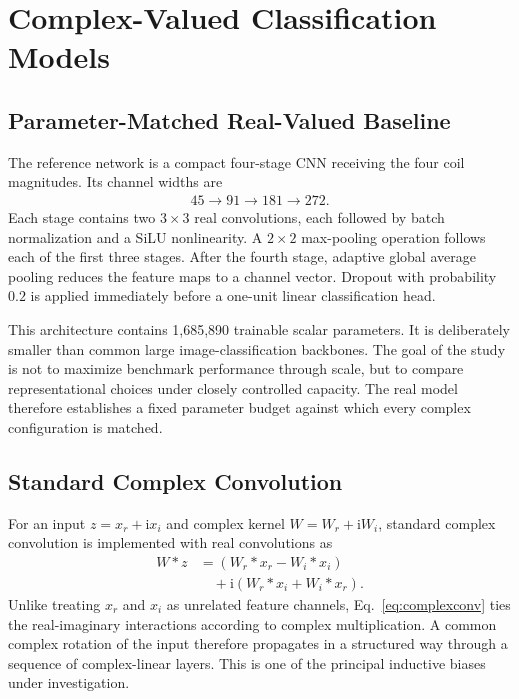 \documentclass[journal]{IEEEtran}
\begin{document}
\section{Complex-Valued Classification Models}\label{sec:models}
\subsection{Parameter-Matched Real-Valued Baseline}
The reference network is a compact four-stage \ac{CNN} receiving the four coil magnitudes. Its channel widths are
\begin{align}
45 \rightarrow 91 \rightarrow 181 \rightarrow 272.
\end{align}
Each stage contains two $3\times3$ real convolutions, each followed by batch normalization and a SiLU nonlinearity. A $2\times2$ max-pooling operation follows each of the first three stages. After the fourth stage, adaptive global average pooling reduces the feature maps to a channel vector. Dropout with probability $0.2$ is applied immediately before a one-unit linear classification head.

This architecture contains 1,685,890 trainable scalar parameters. It is deliberately smaller than common large image-classification backbones. The goal of the study is not to maximize benchmark performance through scale, but to compare representational choices under closely controlled capacity. The real model therefore establishes a fixed parameter budget against which every complex configuration is matched.

\subsection{Standard Complex Convolution}
For an input $z=x_r+\mathrm{i}x_i$ and complex kernel $W=W_r+\mathrm{i}W_i$, standard complex convolution is implemented with real convolutions as
\begin{align}
W*z
&=(W_r*x_r-W_i*x_i) \\
&\quad+\mathrm{i}(W_r*x_i+W_i*x_r).
\label{eq:complexconv}
\end{align}
Unlike treating $x_r$ and $x_i$ as unrelated feature channels, Eq.~\eqref{eq:complexconv} ties the real-imaginary interactions according to complex multiplication. A common complex rotation of the input therefore propagates in a structured way through a sequence of complex-linear layers. This is one of the principal inductive biases under investigation.
\end{document}

